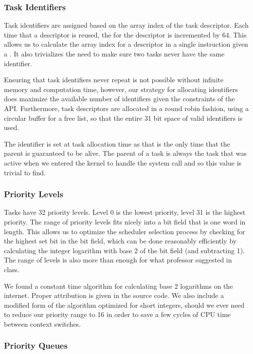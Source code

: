 \documentclass[pdftex,10pt,a4paper]{article}
\begin{document}
\subsubsection*{Task Identifiers}

Task identifiers are assigned based on the array index of the task
descriptor. Each time that a descriptor is reused, the  for
the descriptor is incremented by 64. This allows us to calculate the
array index for a descriptor in a single instruction given a
. It also trivializes the need to make sure two tasks never
have the same identifier.

Ensuring that task identifiers never repeat is not possible without
infinite memory and computation time, however, our strategy for
allocating identifiers does maximize the available number of
identifiers given the constraints of the API. Furthermore, task
descriptors are allocated in a round robin fashion, using a circular
buffer for a free list, so that the entire 31 bit space of valid
identifiers is used.

The  identifier is set at task allocation time as that is
the only time that the parent is guaranteed to be alive. The parent of
a task is always the task that was active when we entered the kernel
to handle the system call and so this value is trivial to find.

\subsubsection*{Priority Levels}

Tasks have 32 priority levels. Level 0 is the lowest priority, level
31 is the highest priority. The range of priority levels fits nicely
into a bit field that is one word in length. This allows us to
optimize the scheduler selection process by checking for the highest
set bit in the bit field, which can be done reasonably efficiently by
calculating the integer logarithm with base 2 of the bit field (and
subtracting 1). The range of levels is also more than enough for what
professor suggested in class.

We found a constant time algorithm for calculating base 2 logarithms
on the internet. Proper attribution is given in the source code. We
also include a modified form of the algorithm optimized for short
integers, should we ever need to reduce our priority range to 16 in
order to save a few cycles of CPU time between context switches.

\subsubsection*{Priority Queues}
\end{document}
